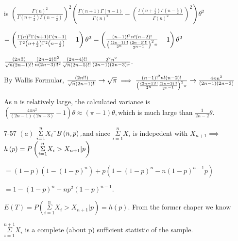 \documentclass{article}
\begin{document}
is $\left( \frac{\Gamma \left( n\right) ^{2}}{\Gamma \left( n+\frac{1}{2}%
\right) \Gamma \left( n-\frac{1}{2}\right) }\right) ^{2}\left( \frac{\Gamma
\left( n+1\right) \Gamma \left( n-1\right) }{\Gamma \left( n\right) ^{2}}%
-\left( \frac{\Gamma \left( n+\frac{1}{2}\right) \Gamma \left( n-\frac{1}{2}%
\right) }{\Gamma \left( n\right) ^{2}}\right) ^{2}\right) \theta ^{2}$

$=\left( \frac{\Gamma \left( n\right) ^{2}\Gamma \left( n+1\right) \Gamma
\left( n-1\right) }{\Gamma ^{2}\left( n+\frac{1}{2}\right) \Gamma ^{2}\left(
n-\frac{1}{2}\right) }-1\right) \theta ^{2}=\left( \frac{\left( n-1\right)
!^{2}n!\left( n-2\right) !}{\left( \frac{\left( 2n-1\right) !!}{2^{n}}\frac{%
\left( 2n-3\right) !!}{2^{n-1}}\right) ^{2}\pi }-1\right) \theta ^{2}$

$\frac{\left( 2n!!\right) }{\sqrt{n}\left( 2n-1\right) !!}\frac{\left(
2n-2\right) !!^{2}}{n\left( 2n-3\right) !!^{2}}\frac{\left( 2n-4\right) !!}{%
\sqrt{n}\left( 2n-5\right) !!}\frac{2^{2}n^{2}}{\left( 2n-1\right) \left(
2n-3\right) \pi }.$

By Wallis Formular, $\frac{\left( 2n!!\right) }{\sqrt{n}\left( 2n-1\right) !!%
}\rightarrow \sqrt{\pi }\implies \frac{\left( n-1\right) !^{2}n!\left(
n-2\right) !}{\left( \frac{\left( 2n-1\right) !!}{2^{n}}\frac{\left(
2n-3\right) !!}{2^{n-1}}\right) ^{2}\pi }\rightarrow \frac{4\pi n^{2}}{%
\left( 2n-1\right) \left( 2n-3\right) }$

As n is relatively large, the calculated variance is $\left( \frac{4\pi n^{2}%
}{\left( 2n-1\right) \left( 2n-3\right) }-1\right) \theta \approx \left( \pi
-1\right) \theta ,$which is much large than $\frac{1}{2n-2}\theta .$

7-57 $\left( a\right) $ $\underset{i=1}{\overset{n}{\Sigma }}X_{i}\symbol{126%
}B\left( n,p\right) ,$and since $\underset{i=1}{\overset{n}{\Sigma }}X_{i}$
is indepedent with $X_{n+1}\implies $ $h\left( p\right) =P\left( \underset{%
i=1}{\overset{n}{\Sigma }}X_{i}>X_{n+1}|p\right) $

$=\left( 1-p\right) \left( 1-\left( 1-p\right) ^{n}\right) +p\left( 1-\left(
1-p\right) ^{n}-n\left( 1-p\right) ^{n-1}p\right) $

$=\allowbreak 1-\left( 1-p\right) ^{n}-np^{2}\left( 1-p\right) ^{n-1}.$

$E\left( T\right) =P\left( \underset{i=1}{\overset{n}{\Sigma }}%
X_{i}>X_{n+1}|p\right) =h\left( p\right) .$ From the former chaper we know

$\underset{i=1}{\overset{n+1}{\Sigma }}X_{i}$ is a complete (about p)
sufficient statistic of the sample.
\end{document}
